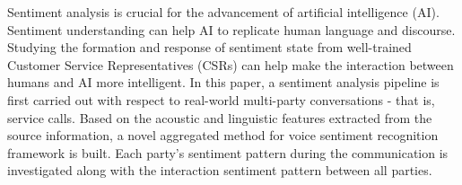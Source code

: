 Sentiment analysis is crucial for the advancement of artificial intelligence (AI). Sentiment understanding can help AI to replicate human language and discourse. Studying the formation and response of sentiment state from well-trained Customer Service Representatives (CSRs) can help make the interaction between humans and AI more intelligent. In this paper, a sentiment analysis pipeline is first carried out with respect to real-world multi-party conversations - that is, service calls. Based on the acoustic and linguistic features extracted from the source information,  a novel aggregated method for voice sentiment recognition framework is built. Each party's sentiment pattern during the communication is investigated along with the interaction sentiment pattern between all parties.
